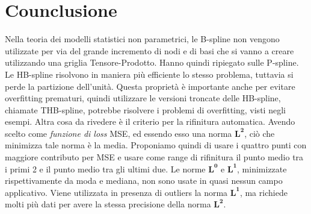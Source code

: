 \documentclass[../main.tex]{subfiles}
\begin{document}
\section{Counclusione}
Nella teoria dei modelli statistici non parametrici, le B-spline non vengono utilizzate per via del grande incremento di nodi e di basi 
che si vanno a creare utilizzando una griglia Tensore-Prodotto. Hanno quindi ripiegato sulle P-spline. Le HB-spline risolvono in maniera 
più efficiente lo stesso problema, tuttavia si perde la partizione dell'unità. Questa proprietà è importante anche per evitare overfitting 
prematuri, quindi utilizzare le versioni troncate delle HB-spline, chiamate THB-spline, potrebbe risolvere i problemi di overfitting, 
visti negli esempi. Altra cosa da rivedere è il criterio per la rifinitura automatica. Avendo scelto come \textit{funzione di loss} 
MSE, ed essendo 
esso una norma $\mathbf{L^2}$, ciò che minimizza tale norma è la media. Proponiamo quindi di usare i quattro punti con maggiore 
contributo per MSE e usare come range di rifinitura il punto medio tra i primi 2 e il punto medio tra gli ultimi due. Le norme $\mathbf{L^0}$ 
e $\mathbf{L^1}$, minimizzate rispettivamente da moda e mediana, non sono usate in quasi nessun campo applicativo. Viene utilizzata 
in presenza di outliers la norma $\mathbf{L^1}$, ma richiede molti più dati per avere la stessa precisione della norma $\mathbf{L^2}$.
\end{document}
